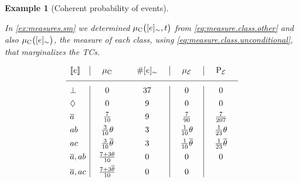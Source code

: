 \documentclass[a4paper]{article}
\newtheorem{example}{Example}
\newtheorem{example}{Example}
\newcommand{\at}[1]{\ensuremath{\!\del{#1}}}        %
\newcommand{\cla}[1]{\ensuremath{{\cal #1}}}        %
\newcommand{\co}[1]{\ensuremath{\overline{#1}}}     %
\newcommand{\EVENTSset}{\ensuremath{\cla{E}}}
\newcommand{\prfunc}{\ensuremath{\mathrm{P}}}
\newcommand{\prd}[1]{\ensuremath{\prfunc_{#1}}}
\newcommand{\prE}{\prd{\EVENTSset}}
\newcommand{\pwC}{\ensuremath{\mu_{\textrm{C}}}}
\newcommand{\pwc}[1]{\ensuremath{\pwC\at{#1}}}
\newcommand{\pwE}{\ensuremath{\mu_{\EVENTSset}}}
\newcommand{\stablecore}[1]{\ensuremath{\left\llbracket #1 \right\rrbracket}}
\newcommand{\inconsistent}{\bot}
\newcommand{\indepclass}{\ensuremath{\Diamond}}
\newcommand{\class}[1]{\ensuremath{[{#1}]_{\sim}}}
\newcommand{\franc}[1]{{\color{green!30!black}#1}}
\begin{document}
\franc{
\begin{example}[Coherent probability of events]\label{ex:choerent.probability}\em
    
  In \cref{ex:measures.sm} we determined \(\pwc{\class{e}, t}\) from
  \cref{eq:measure.class.other} and also \(\pwc{\class{e}}\), the
  measure of each class, using \cref{eq:measure.class.unconditional},
  that marginalizes the \aclp{TC}.

    \begin{equation*}
        \begin{array}{l|cc|c|c}
            \stablecore{e}
                & \hspace{1em}\pwC\hspace{1em}
                & \hspace{1em}\#\class{e}\hspace{1em}
                & \hspace{1em}\pwE\hspace{1em}
                & \hspace{1em}\prE\hspace{1em}
            \\
            \hline
            \inconsistent
                & 0
                & 37
                & 0
                & 0                           
            \\[4pt]
            \indepclass
                & 0
                & 9
                & 0
                & 0                           
            \\[4pt]
            \co{a}
                & \frac{7}{10}
                & 9
                & \frac{7}{90}
                & \frac{7}{207}
            \\[4pt]
            ab
                & \frac{3}{10}\theta
                & 3
                & \frac{1}{10}\theta
                & \frac{1}{23}\theta
            \\[4pt]
            ac
                & \frac{3}{10}\co{\theta}
                & 3
                & \frac{1}{10}\co{\theta}
                & \frac{1}{23}\co{\theta}
            \\[4pt]
            \co{a}, ab
                & \frac{7 + 3\theta}{10}
                & 0
                & 0
                & 0
            \\[4pt]
            \co{a}, ac
                & \frac{7 + 3\co{\theta}}{10}
                & 0
                & 0

\end{array}
\end{equation*}
\end{example}}
\end{document}
